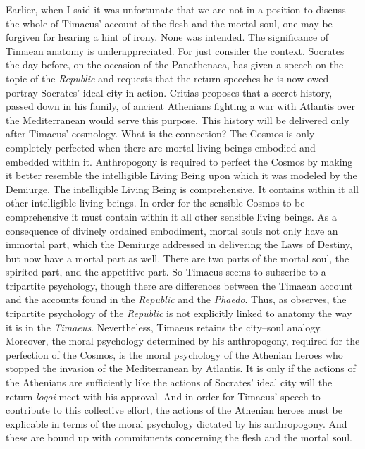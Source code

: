 Earlier, when I said it was unfortunate that we are not in a position to discuss the whole of Timaeus' account of the flesh and the mortal soul, one may be forgiven for hearing a hint of irony. None was intended. The significance of Timaean anatomy is underappreciated. For just consider the context. Socrates the day before, on the occasion of the Panathenaea, has given a speech on the topic of the \emph{Republic} and requests that the return speeches he is now owed portray Socrates' ideal city in action. Critias proposes that a secret history, passed down in his family, of ancient Athenians fighting a war with Atlantis over the Mediterranean would serve this purpose. This history will be delivered only after Timaeus' cosmology. What is the connection? The Cosmos is only completely perfected when there are mortal living beings embodied and embedded within it. Anthropogony is required to perfect the Cosmos by making it better resemble the intelligible Living Being upon which it was modeled by the Demiurge. The intelligible Living Being is comprehensive. It contains within it all other intelligible living beings. In order for the sensible Cosmos to be comprehensive it must contain within it all other sensible living beings. As a consequence of divinely ordained embodiment, mortal souls not only have an immortal part, which the Demiurge addressed in delivering the Laws of Destiny, but now have a mortal part as well. There are two parts of the mortal soul, the spirited part, and the appetitive part. So Timaeus seems to subscribe to a tripartite psychology, though there are differences between the Timaean account and the accounts found in the \emph{Republic} and the \emph{Phaedo}. Thus, as \citet[496]{Taylor:1928qb} observes, the tripartite psychology of the \emph{Republic} is not explicitly linked to anatomy the way it is in the \emph{Timaeus}. Nevertheless, Timaeus retains the city--soul analogy. Moreover, the moral psychology determined by his anthropogony, required for the perfection of the Cosmos, is the moral psychology of the Athenian heroes who stopped the invasion of the Mediterranean by Atlantis. It is only if the actions of the Athenians are sufficiently like the actions of Socrates' ideal city will the return \emph{logoi} meet with his approval. And in order for Timaeus' speech to contribute to this collective effort, the actions of the Athenian heroes must be explicable in terms of the moral psychology dictated by his anthropogony. And these are bound up with commitments concerning the flesh and the mortal soul.


